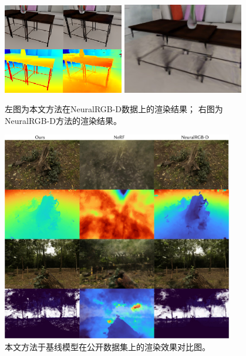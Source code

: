 \begin{figure}[ht]
	\begin{center}
	\includegraphics[width=0.47\textwidth]{undergraduate-thesis/images/experiments/omninerf-qualitative.png}
	\includegraphics[width=0.47\textwidth]{undergraduate-thesis/images/experiments/neural-rgbd failure case.jpg}
	\end{center}
	\caption{左图为本文方法在NeuralRGB-D数据上的渲染结果； 右图为NeuralRGB-D方法的渲染结果。}
	\label{fig:omninerf-qualitative}
\end{figure}

\begin{figure}[ht]
	\begin{center}
	\includegraphics[width=0.9\textwidth]{undergraduate-thesis/images/omni-nerf/omninerf-stump.pdf}
	\end{center}
	\caption{本文方法于基线模型在公开数据集上的渲染效果对比图。}
	\label{fig:omninerf-stump}
\end{figure}

